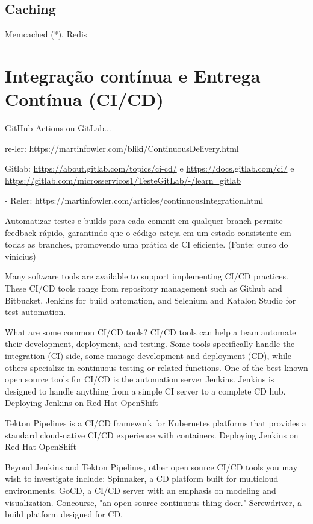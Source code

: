 \subsection{Caching}
Memcached (*), Redis

\section{Integração contínua e Entrega Contínua (CI/CD)}

GitHub Actions ou GitLab... 

re-ler: https://martinfowler.com/bliki/ContinuousDelivery.html

Gitlab: \url{https://about.gitlab.com/topics/ci-cd/} e \url{https://docs.gitlab.com/ci/} e \url{https://gitlab.com/microsservicos1/TesteGitLab/-/learn_gitlab}

- Reler: https://martinfowler.com/articles/continuousIntegration.html

Automatizar testes e builds para cada commit em qualquer branch permite feedback rápido, garantindo que o código esteja em um estado consistente em todas as branches, promovendo uma prática de CI eficiente. (Fonte: curso do vinicius)

Many software tools are available to support implementing CI/CD practices. These CI/CD tools range from repository management such as Github and Bitbucket, Jenkins for build automation, and Selenium and Katalon Studio for test automation.

What are some common CI/CD tools?
CI/CD tools can help a team automate their development, deployment, and testing. Some tools specifically handle the integration (CI) side, some manage development and deployment (CD), while others specialize in continuous testing or related functions.
One of the best known open source tools for CI/CD is the automation server Jenkins. Jenkins is designed to handle anything from a simple CI server to a complete CD hub.
Deploying Jenkins on Red Hat OpenShift

Tekton Pipelines is a CI/CD framework for Kubernetes platforms that provides a standard cloud-native CI/CD experience with containers.
Deploying Jenkins on Red Hat OpenShift

Beyond Jenkins and Tekton Pipelines, other open source CI/CD tools you may wish to investigate include:
    Spinnaker, a CD platform built for multicloud environments.
    GoCD, a CI/CD server with an emphasis on modeling and visualization.
    Concourse, "an open-source continuous thing-doer."
    Screwdriver, a build platform designed for CD.

